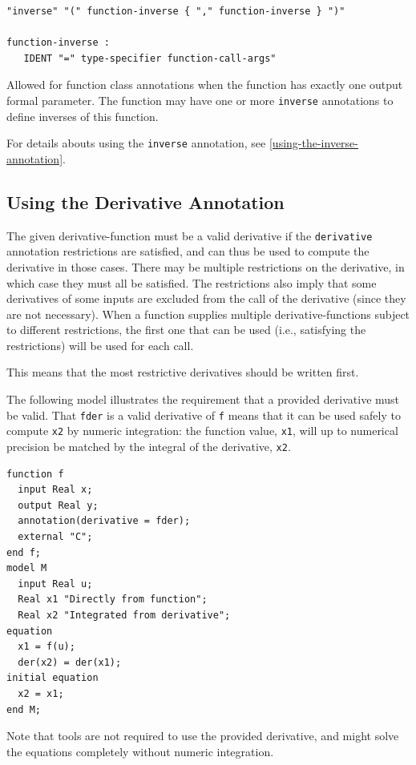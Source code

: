 \begin{annotationdefinition}[inverse]
\begin{synopsis}[grammar]\begin{lstlisting}
"inverse" "(" function-inverse { "," function-inverse } ")"

function-inverse :
   IDENT "=" type-specifier function-call-args"
\end{lstlisting}\end{synopsis}
\begin{semantics}
Allowed for function class annotations when the function has exactly one output formal parameter.
The function may have one or more {\lstinline!inverse!} annotations to define inverses of this function.

For details abouts using the {\lstinline!inverse!} annotation, see \cref{using-the-inverse-annotation}.
\end{semantics}
\end{annotationdefinition}


\subsection{Using the Derivative Annotation}\label{using-the-derivative-annotation}

The given derivative-function must be a valid derivative if the {\lstinline!derivative!} annotation restrictions are satisfied, and can thus be used to compute the derivative in those cases.
There may be multiple restrictions on the derivative, in which case they must all be satisfied.
The restrictions also imply that some derivatives of some inputs are excluded from the call of the derivative (since they are not necessary).
When a function supplies multiple derivative-functions subject to different restrictions, the first one that can be used (i.e., satisfying the restrictions) will be used for each call.

\begin{nonnormative}
This means that the most restrictive derivatives should be written first.
\end{nonnormative}

\begin{example}
The following model illustrates the requirement that a provided derivative must be valid.
That {\lstinline!fder!} is a valid derivative of {\lstinline!f!} means that it can be used safely to compute {\lstinline!x2!} by numeric integration: the function value, {\lstinline!x1!}, will up to numerical precision be matched by the integral of the derivative, {\lstinline!x2!}.
\begin{lstlisting}[language=modelica]
function f
  input Real x;
  output Real y;
  annotation(derivative = fder);
  external "C";
end f;
model M
  input Real u;
  Real x1 "Directly from function";
  Real x2 "Integrated from derivative";
equation
  x1 = f(u);
  der(x2) = der(x1);
initial equation
  x2 = x1;
end M;
\end{lstlisting}
Note that tools are not required to use the provided derivative, and might solve the equations completely without numeric integration.
\end{example}

